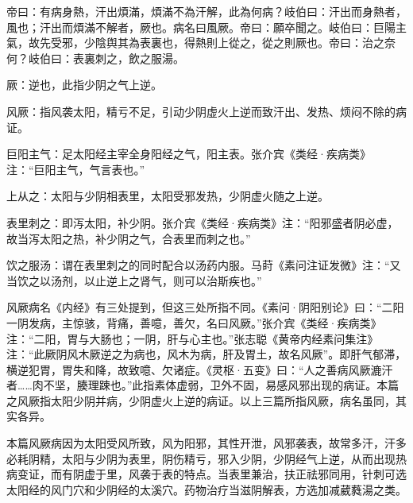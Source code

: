 \documentclass[draft,12pt]{ctexbook}
\begin{document}

\begin{yuanwen}
帝曰：有病身熱，汗出煩滿，煩滿不為汗解，此為何病？岐伯曰：汗出而身熱者，風也；汗出而煩滿不解者，厥也。病名曰風厥。帝曰：願卒聞之。岐伯曰：巨陽主氣，故先受邪，少陰舆其為表裏也，得熱則上從之，從之則厥也。帝曰：治之奈何？岐伯曰：表裏刺之，飲之服湯。
\end{yuanwen}


\begin{jiaozhu}
  \item 厥：逆也，此指少阴之气上逆。
  \item 风厥：指风袭太阳，精亏不足，引动少阴虚火上逆而致汗出、发热、烦闷不除的病证。
  \item 巨阳主气：足太阳经主宰全身阳经之气，阳主表。张介宾《类经·疾病类》注：“巨阳主气，气言表也。”
  \item 上从之：太阳与少阴相表里，太阳受邪发热，少阴虚火随之上逆。
  \item 表里刺之：即泻太阳，补少阴。张介宾《类经·疾病类》注：“阳邪盛者阴必虚，故当泻太阳之热，补少阴之气，合表里而刺之也。”
  \item 饮之服汤：谓在表里刺之的同时配合以汤药内服。马莳《素问注证发微》注：“又当饮之以汤剂，以止逆上之肾气，则可以治斯疾也。”
\end{jiaozhu}



风厥病名《内经》有三处提到，但这三处所指不同。《素问·阴阳别论》曰：“二阳一阴发病，主惊骇，背痛，善噫，善欠，名曰风厥。”张介宾《类经·疾病类》注：“二阳，胃与大肠也；一阴，肝与心主也。”张志聪《黄帝内经素问集注》注：“此厥阴风木厥逆之为病也，风木为病，肝及胃土，故名风厥”。即肝气郁滞，横逆犯胃，胃失和降，故致噫、欠诸症。《灵枢·五变》曰：“人之善病风厥漉汗者……肉不坚，腠理踈也。”此指素体虚弱，卫外不固，易感风邪出现的病证。本篇之风厥指太阳少阴并病，少阴虚火上逆的病证。以上三篇所指风厥，病名虽同，其实各异。


本篇风厥病因为太阳受风所致，风为阳邪，其性开泄，风邪袭表，故常多汗，汗多必耗阴精，太阳与少阴为表里，阴伤精亏，邪入少阴，少阴经气上逆，从而出现热病变证，而有阴虚于里，风袭于表的特点。当表里兼治，扶正祛邪同用，针刺可选太阳经的风门穴和少阴经的太溪穴。药物治疗当滋阴解表，方选加减葳蕤湯之类。

\end{document}
